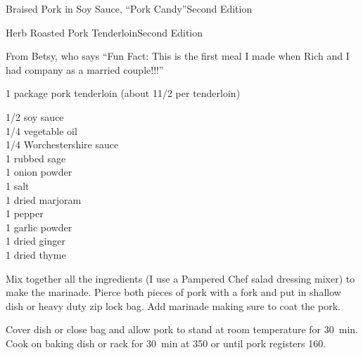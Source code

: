 \begin{entry}{Braised Pork in Soy Sauce, ``Pork Candy''}{Second Edition}
\end{entry}

\begin{entry}{Herb Roasted Pork Tenderloin}{Second Edition}

\begin{open}
  From Betsy, who says ``Fun Fact:  This is the first meal I made when Rich and I had company as a married couple!!!''
\end{open}
\begin{ingredients}
  1 package pork tenderloin (about 1\SI{1/2}{\pound} per tenderloin)
\end{ingredients}
\begin{ingredients}
  \SI{1/2}{\cup} soy sauce\\
  \SI{1/4}{\cup} vegetable oil\\
  \SI{1/4}{\cup} Worchestershire sauce\\
  \SI{1}{\teaspoon} rubbed sage\\
  \SI{1}{\teaspoon} onion powder\\
  \SI{1}{\teaspoon} salt\\
  \SI{1}{\teaspoon} dried marjoram\\
  \SI{1}{\teaspoon} pepper\\
  \SI{1}{\teaspoon} garlic powder\\
  \SI{1}{\teaspoon} dried ginger\\
  \SI{1}{\teaspoon} dried thyme
\end{ingredients}
Mix together all the ingredients (I use a Pampered Chef salad dressing mixer) to
make the marinade. Pierce both pieces of pork with a fork and put in shallow
dish or heavy duty zip lock bag. Add marinade making sure to coat the pork.

Cover dish or close bag and allow pork to stand at room temperature for
\SI{30}{\minute}. Cook on baking dish or rack for \SI{30}{\minute} at
\SI{350}{\degreeF} or until pork registers \SI{160}{\degreeF}.

\end{entry}

